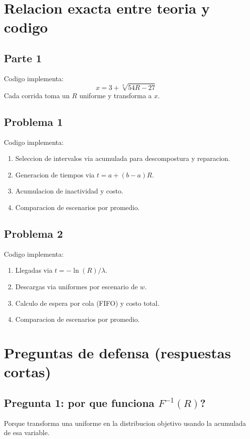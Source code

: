 \documentclass[12pt,a4paper]{article}
\begin{document}
\section{Relacion exacta entre teoria y codigo}

\subsection{Parte 1}
Codigo implementa:
\[
x=3+\sqrt[3]{54R-27}
\]
Cada corrida toma un $R$ uniforme y transforma a $x$.

\subsection{Problema 1}
Codigo implementa:
\begin{enumerate}
  \item Seleccion de intervalos via acumulada para descompostura y reparacion.
  \item Generacion de tiempos via $t=a+(b-a)R$.
  \item Acumulacion de inactividad y costo.
  \item Comparacion de escenarios por promedio.
\end{enumerate}

\subsection{Problema 2}
Codigo implementa:
\begin{enumerate}
  \item Llegadas via $t=-\ln(R)/\lambda$.
  \item Descargas via uniformes por escenario de $w$.
  \item Calculo de espera por cola (FIFO) y costo total.
  \item Comparacion de escenarios por promedio.
\end{enumerate}

\section{Preguntas de defensa (respuestas cortas)}

\subsection*{Pregunta 1: por que funciona $F^{-1}(R)$?}
Porque transforma una uniforme en la distribucion objetivo usando la acumulada de esa variable.
\end{document}
